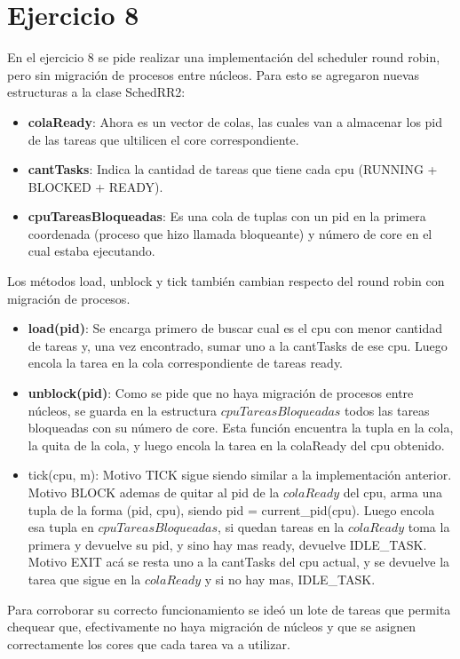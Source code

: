 \section{Ejercicio 8}

En el ejercicio 8 se pide realizar una implementación del scheduler round robin, pero sin migración de procesos entre núcleos.
Para esto se agregaron nuevas estructuras a la clase SchedRR2:
\begin{itemize}
\item \textbf{colaReady}: Ahora es un vector de colas, las cuales van a almacenar los pid de las tareas que ultilicen el core correspondiente.
\item \textbf{cantTasks}: Indica la cantidad de tareas que tiene cada cpu (RUNNING + BLOCKED + READY).
\item \textbf{cpuTareasBloqueadas}: Es una cola de tuplas con un pid en la primera coordenada (proceso que hizo llamada bloqueante) y número de core en el cual estaba ejecutando.
\end{itemize}

Los métodos load, unblock y tick también cambian respecto del round robin con migración de procesos.

\begin{itemize}
\item \textbf{load(pid)}: Se encarga primero de buscar cual es el cpu con menor cantidad de tareas y, una vez encontrado, sumar uno a la cantTasks de ese cpu. Luego encola la tarea en la cola correspondiente de tareas ready.
\item \textbf{unblock(pid)}: Como se pide que no haya migración de procesos entre núcleos, se guarda en la estructura $cpuTareasBloqueadas$ todos las tareas bloqueadas con su número de core. Esta función encuentra la tupla en la cola, la quita de la cola, y luego encola la tarea en la colaReady del cpu obtenido.
\item tick(cpu, m): Motivo TICK sigue siendo similar a la implementación anterior. Motivo BLOCK ademas de quitar al pid de la $colaReady$ del cpu, arma una tupla de la forma (pid, cpu), siendo pid = current_pid(cpu). Luego encola esa tupla en $cpuTareasBloqueadas$, si quedan tareas en la $colaReady$ toma la primera y devuelve su pid, y sino hay mas ready, devuelve IDLE_TASK. Motivo EXIT acá se resta uno a la cantTasks del cpu actual, y se devuelve la tarea que sigue en la $colaReady$ y si no hay mas, IDLE_TASK.
\end{itemize}


Para corroborar su correcto funcionamiento se ideó un lote de tareas que permita chequear que, efectivamente no haya migración de núcleos y que se asignen correctamente 
los cores que cada tarea va a utilizar. 

